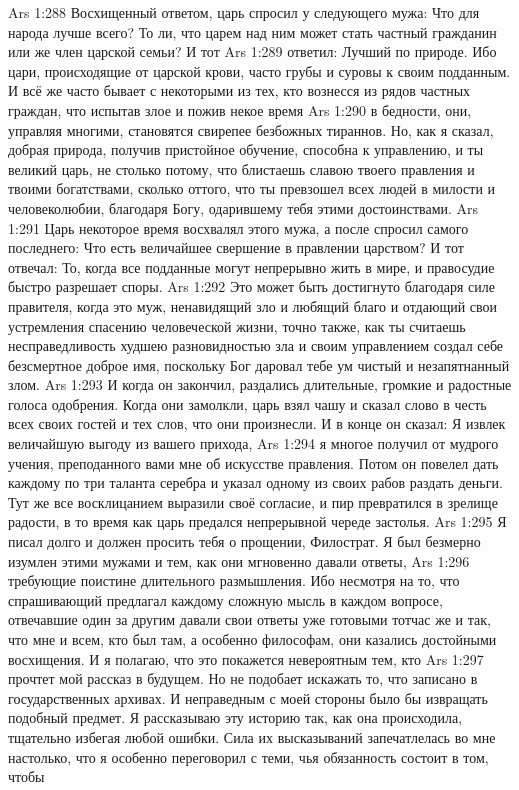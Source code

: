 \vs Ars 1:288
Восхищенный ответом, царь спросил у следующего мужа: Что для народа лучше всего? То ли, что царем над ним может стать частный гражданин или же член царской семьи? И тот
\vs Ars 1:289
ответил: Лучший по природе. Ибо цари, происходящие от царской крови, часто грубы и суровы к своим подданным. И всё же часто бывает с некоторыми из тех, кто вознесся из рядов частных граждан, что испытав злое и пожив некое время
\vs Ars 1:290
в бедности, они, управляя многими, становятся свирепее безбожных тираннов. Но, как я сказал, добрая природа, получив пристойное обучение, способна к управлению, и ты великий царь, не столько потому, что блистаешь славою твоего правления и твоими богатствами, сколько оттого, что ты превзошел всех людей в милости и человеколюбии, благодаря Богу, одарившему тебя этими достоинствами.
\vs Ars 1:291
Царь некоторое время восхвалял этого мужа, а после спросил самого последнего: Что есть величайшее свершение в правлении царством? И тот отвечал: То, когда все подданные могут непрерывно жить в мире, и правосудие быстро разрешает споры.
\vs Ars 1:292
Это может быть достигнуто благодаря силе правителя, когда это муж, ненавидящий зло и любящий благо и отдающий свои устремления спасению человеческой жизни, точно также, как ты считаешь несправедливость худшею разновидностью зла и своим управлением создал себе безсмертное доброе имя, поскольку Бог даровал тебе ум чистый и незапятнанный злом.
\vs Ars 1:293
И когда он закончил, раздались длительные, громкие и радостные голоса одобрения. Когда они замолкли, царь взял чашу и сказал слово в честь всех своих гостей и тех слов, что они произнесли. И в конце он сказал: Я извлек величайшую выгоду из вашего прихода,
\vs Ars 1:294
я многое получил от мудрого учения, преподанного вами мне об искусстве правления. Потом он повелел дать каждому по три таланта серебра и указал одному из своих рабов раздать деньги. Тут же все восклицанием выразили своё согласие, и пир превратился в зрелище радости, в то время как царь предался непрерывной череде застолья.
\vs Ars 1:295
Я писал долго и должен просить тебя о прощении, Филострат. Я был безмерно изумлен этими мужами и тем, как они мгновенно давали ответы,
\vs Ars 1:296
требующие поистине длительного размышления. Ибо несмотря на то, что спрашивающий предлагал каждому сложную мысль в каждом вопросе, отвечавшие один за другим давали свои ответы уже готовыми тотчас же и так, что мне и всем, кто был там, а особенно философам, они казались достойными восхищения. И я полагаю, что это покажется невероятным тем, кто
\vs Ars 1:297
прочтет мой рассказ в будущем. Но не подобает искажать то, что записано в государственных архивах. И неправедным с моей стороны было бы извращать подобный предмет. Я рассказываю эту историю так, как она происходила, тщательно избегая любой ошибки. Сила их высказываний запечатлелась во мне настолько, что я особенно переговорил с теми, чья обязанность состоит в том, чтобы
